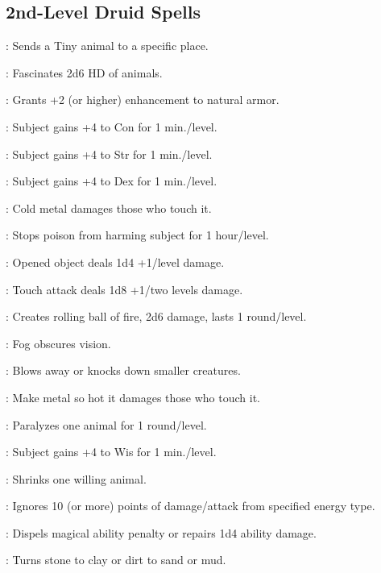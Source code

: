\begin{multicols}{2}
\subsection{2nd-Level Druid Spells}
\begin{description*}
\item[\linkspell{Animal Messenger}:] Sends a Tiny animal to a specific place.
\item[\linkspell{Animal Trance}:] Fascinates 2d6 HD of animals.
\item[\linkspell{Barkskin}:] Grants +2 (or higher) enhancement to natural armor.
\item[\linkspell{Bear’s Endurance}:] Subject gains +4 to Con for 1 min./level.
\item[\linkspell{Bull’s Strength}:] Subject gains +4 to Str for 1 min./level.
\item[\linkspell{Cat’s Grace}:] Subject gains +4 to Dex for 1 min./level.
\item[\linkspell{Chill Metal}:] Cold metal damages those who touch it.
\item[\linkspell{Delay Poison}:] Stops poison from harming subject for 1 hour/level.
\item[\linkspell{Fire Trap}:] Opened object deals 1d4 +1/level damage.
\item[\linkspell{Flame Blade}:] Touch attack deals 1d8 +1/two levels damage.
\item[\linkspell{Flaming Sphere}:] Creates rolling ball of fire, 2d6 damage, lasts 1 round/level.
\item[\linkspell{Fog Cloud}:] Fog obscures vision.
\item[\linkspell{Gust of Wind}:] Blows away or knocks down smaller creatures.
\item[\linkspell{Heat Metal}:] Make metal so hot it damages those who touch it.
\item[\linkspell{Hold Animal}:] Paralyzes one animal for 1 round/level.
\item[\linkspell{Owl’s Wisdom}:] Subject gains +4 to Wis for 1 min./level.
\item[\linkspell{Reduce Animal}:] Shrinks one willing animal.
\item[\linkspell{Resist Energy}:] Ignores 10 (or more) points of damage/attack from specified energy type.
\item[\linkspell{Restoration, Lesser}:] Dispels magical ability penalty or repairs 1d4 ability damage.
\item[\linkspell{Soften Earth and Stone}:] Turns stone to clay or dirt to sand or mud.

\end{description*}
\end{multicols}
